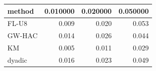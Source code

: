 \begin{tabular}{lrrr}
\toprule
method & 0.010000 & 0.020000 & 0.050000 \\
\midrule
FL-U8 & 0.009 & 0.020 & 0.053 \\
GW-HAC & 0.014 & 0.026 & 0.044 \\
KM & 0.005 & 0.011 & 0.029 \\
dyadic & 0.016 & 0.023 & 0.049 \\
\bottomrule
\end{tabular}
